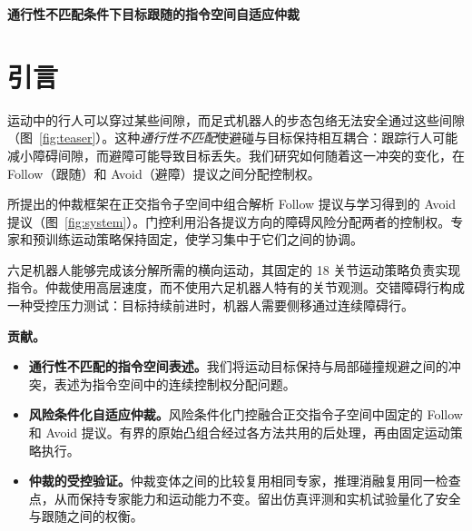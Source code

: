 \begin{center}
{\LARGE\bfseries 通行性不匹配条件下目标跟随的指令空间自适应仲裁}\par
\end{center}
\begin{abstract}
足式机器人在杂乱环境中跟随行人时，可能遇到行人能够通过、机器人却无法安全通过的通道。这种通行性不匹配使目标恢复与障碍间隙之间产生冲突。我们提出一种指令空间自适应仲裁框架，协调解析生成的前向—偏航跟随提议与预训练的横向避障提议。学习仲裁门控根据风险调整两者的相对控制权，同时固定两个专家和运动策略，使学习集中于行为协调。在留出评测中，该方法在 $0.60\,\mathrm{m/s}$ 下实现了 $95.3\%$ 的任务成功率，该速度比训练最高速度高 $20\%$。结合机载目标检测和双目深度，该方法在交错行走廊和急转弯走廊的 40 次实机试验中成功 37 次。与加性融合、固定控制权和单体 PPO 的比较支持了情境相关控制权分配在所测条件下的价值。
\end{abstract}

\section{引言}
运动中的行人可以穿过某些间隙，而足式机器人的步态包络无法安全通过这些间隙（图~\ref{fig:teaser}）。这种\emph{通行性不匹配}使避碰与目标保持相互耦合：跟踪行人可能减小障碍间隙，而避障可能导致目标丢失。我们研究如何随着这一冲突的变化，在 Follow（跟随）和 Avoid（避障）提议之间分配控制权。

所提出的仲裁框架在正交指令子空间中组合解析 Follow 提议与学习得到的 Avoid 提议（图~\ref{fig:system}）。门控利用沿各提议方向的障碍风险分配两者的控制权。专家和预训练运动策略保持固定，使学习集中于它们之间的协调。


六足机器人能够完成该分解所需的横向运动，其固定的 18 关节运动策略负责实现指令。仲裁使用高层速度，而不使用六足机器人特有的关节观测。交错障碍行构成一种受控压力测试：目标持续前进时，机器人需要侧移通过连续障碍行。

\noindent\textbf{贡献。}
\begin{itemize}
\item \textbf{通行性不匹配的指令空间表述。}我们将运动目标保持与局部碰撞规避之间的冲突，表述为指令空间中的连续控制权分配问题。
\item \textbf{风险条件化自适应仲裁。}风险条件化门控融合正交指令子空间中固定的 Follow 和 Avoid 提议。有界的原始凸组合经过各方法共用的后处理，再由固定运动策略执行。
\item \textbf{仲裁的受控验证。}仲裁变体之间的比较复用相同专家，推理消融复用同一检查点，从而保持专家能力和运动能力不变。留出仿真评测和实机试验量化了安全与跟随之间的权衡。
\end{itemize}

